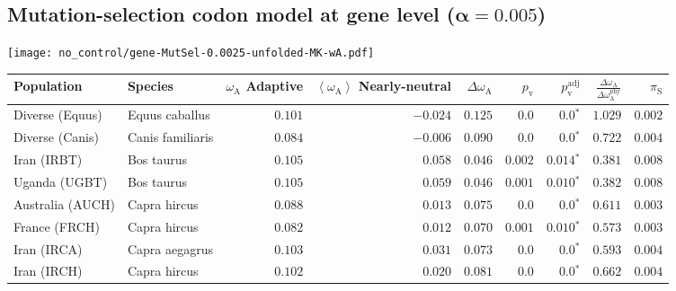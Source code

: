 \subsection{Mutation-selection codon model at gene level ($\bm{\alpha=0.005}$)}
\begin{center}
    \texttt{[image: no\_control/gene-MutSel-0.0025-unfolded-MK-wA.pdf]}
    \begin{adjustbox}{width = 1\textwidth}
        \begin{tabular}{|l|l|r|r|r|r|r|r|r|}
            \toprule
            Population & Species & \specialcell{$\omega_{\mathrm{A}}$ \\ Adaptive}                & \specialcell{$\left< \omega_{\mathrm{A}} \right>$ \\ Nearly-neutral}                & $\Delta \omega_{\mathrm{A}} $    & $p_{\mathrm{v}}$ & $p_{\mathrm{v}}^{\mathrm{adj}}$ & $\frac{\Delta\omega_{\mathrm{A}}}{\Delta\omega_{\mathrm{A}}^{\mathrm{phy}}}$ & $\pi_{\textrm{S}}$    \\
            \midrule
            Diverse (Equus)                    & Equus caballus          & $ 0.101$ & $-0.024$ & $ 0.125$ & $0.0$ & $\bm{0.0{^*}}$ & $ 1.029$ & $ 0.002$ \\
            Diverse (Canis)                  & Canis familiaris          & $ 0.084$ & $-0.006$ & $ 0.090$ & $0.0$ & $\bm{0.0{^*}}$ & $ 0.722$ & $ 0.004$ \\
            Iran (IRBT)               & Bos taurus        & $ 0.105$ & $ 0.058$ & $ 0.046$ & $ 0.002$    & $\bm{ 0.014{^*}}$    & $ 0.381$ & $ 0.008$ \\
            Uganda (UGBT)                  & Bos taurus        & $ 0.105$ & $ 0.059$ & $ 0.046$ & $ 0.001$ & $\bm{ 0.010{^*}}$ & $ 0.382$ & $ 0.008$ \\
            Australia (AUCH)                    & Capra hircus      & $ 0.088$ & $ 0.013$ & $ 0.075$ & $0.0$    & $\bm{0.0{^*}}$    & $ 0.611$ & $ 0.003$ \\
            France (FRCH)                    & Capra hircus        & $ 0.082$ & $ 0.012$ & $ 0.070$ & $ 0.001$    & $\bm{ 0.010{^*}}$    & $ 0.573$ & $ 0.003$ \\
            Iran (IRCA)                   & Capra aegagrus        & $ 0.103$ & $ 0.031$ & $ 0.073$ & $0.0$    & $\bm{0.0{^*}}$    & $ 0.593$ & $ 0.004$ \\
            Iran (IRCH)                 & Capra hircus        & $ 0.102$ & $ 0.020$ & $ 0.081$ & $0.0$    & $\bm{0.0{^*}}$    & $ 0.662$ & $ 0.004$ \\

\end{tabular}
\end{adjustbox}
\end{center}
